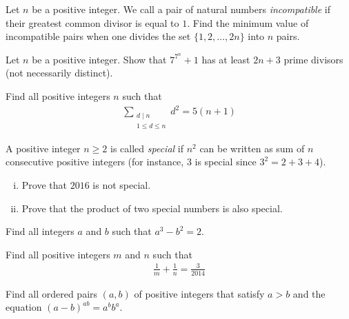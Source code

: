 \documentclass[problems.tex]{subfile}
\begin{document}
	\begin{problem}
		Let $n$ be a positive integer. We call a pair of natural numbers \textit{incompatible} if their greatest common divisor is equal to $1$. Find the minimum value of incompatible pairs when one divides the set $\{1,2,\dots,2n\}$ into $n$ pairs.
	\end{problem}


	\begin{problem}
		Let $n$ be a positive integer. Show that $7^{7^n} + 1$ has at least $2n + 3$ prime divisors (not necessarily distinct).
	\end{problem}



	\begin{problem}
		Find all positive integers $n$ such that
		\begin{align*}
			\sum_{\substack{d \mid n \\ 1 \leq d \leq n}} d^2 = 5(n+1)
		\end{align*}
	\end{problem}


	\begin{problem}
		A positive integer $n \geq 2$ is called \textit{special} if $n^2$ can be written as sum of $n$ consecutive positive integers (for instance, $3$ is special since $3^2 = 2 + 3 + 4$).
		\begin{enumerate}[(i)]
			\item Prove that $2016$ is not special.
			\item Prove that the product of two special numbers is also special.
		\end{enumerate}
	\end{problem}


	\begin{problem}
		Find all integers $a$ and $b$ such that $a^3 - b^2 = 2$.
	\end{problem}


	\begin{problem}
		Find all positive integers $m$ and $n$ such that
		\begin{align*}
			\frac{1}{m} + \frac{1}{n} = \frac{3}{2014}
		\end{align*}
	\end{problem}



	\begin{problem}
		Find all ordered pairs $(a,b)$ of positive integers that satisfy $a>b$ and the equation $(a-b)^{ab}=a^bb^a$. %
	\end{problem}
\end{document}
